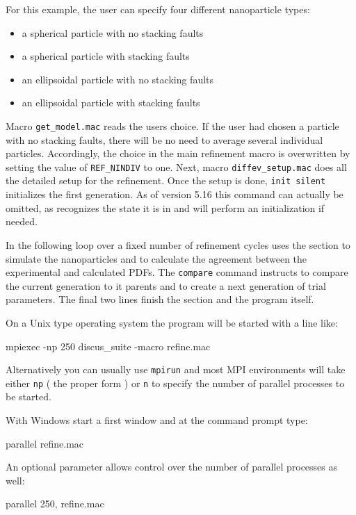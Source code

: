 For this example, the user can
specify four different nanoparticle types:
\begin{itemize}
  \item a spherical particle with no stacking faults
  \item a spherical particle with stacking faults
  \item an ellipsoidal particle with no stacking faults
  \item an ellipsoidal particle with stacking faults
\end{itemize}
Macro {\tt get\_model.mac} reads the users choice. If the user had chosen 
a particle with no stacking faults, there will be no need to average
several individual particles. Accordingly, the choice in the main
refinement macro is
overwritten by setting the value of {\tt REF\_NINDIV} to one.
Next, macro {\tt diffev\_setup.mac} does all the detailed setup for the 
refinement. Once the setup is done, {\tt init silent} initializes the first
generation. As of version 5.16 this command can actually be omitted, as 
\Diffev recognizes the state it is in and will perform an initialization
if needed.

In the following loop over a fixed number of refinement cycles 
\Diffev uses the \Discus section to simulate the nanoparticles and to calculate
the agreement between the experimental and calculated PDFs. The {\tt compare}
command instructs \Diffev to compare the current generation to it parents and
to create a next generation of trial parameters.  
The final two lines finish the \Diffev section and the \Suite program itself.

On a Unix type operating system the \Suite program will be started with a line like:

\begin{MacVerbatim}
mpiexec -np 250 discus_suite -macro refine.mac
\end{MacVerbatim}
Alternatively you can usually use {\tt mpirun} and most MPI environments 
will take either {\tt np} ( the proper form ) or {\tt n} to specify the 
number of parallel processes to be started. 

With Windows start a first \Suite window and at the command prompt type:

\begin{MacVerbatim}
parallel refine.mac
\end{MacVerbatim}

An optional parameter allows control over the number of parallel processes as 
well:
\begin{MacVerbatim}
parallel 250, refine.mac
\end{MacVerbatim}

